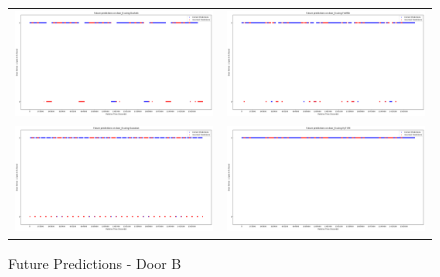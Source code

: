 \begin{figure}
  \begin{tabular}{cc}
    {\includegraphics[width = 3in]{images/results/Future_door_B_Duckett.png}} &
    {\includegraphics[width = 3in]{images/results/Future_door_B_FreMEn.png}} \\
    {\includegraphics[width = 3in]{images/results/Future_door_B_Gaussian.png}} &
    {\includegraphics[width = 3in]{images/results/Future_door_B_HyT-EM.png}} \\
  \end{tabular}
  \caption{Future Predictions - Door B}
\end{figure}\\ \\

